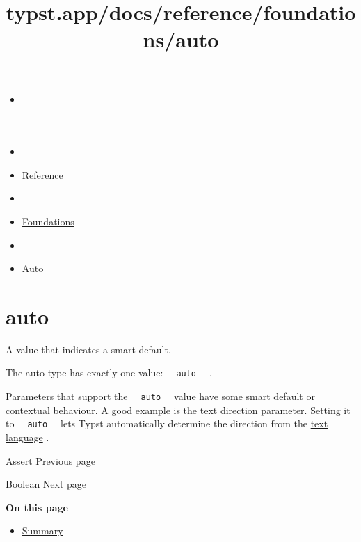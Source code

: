 \title{typst.app/docs/reference/foundations/auto}

\begin{itemize}
\tightlist
\item
  \href{/docs}{}
\item
  
\item
  \href{/docs/reference/}{Reference}
\item
  
\item
  \href{/docs/reference/foundations/}{Foundations}
\item
  
\item
  \href{/docs/reference/foundations/auto/}{Auto}
\end{itemize}

\section{\texorpdfstring{{ auto }}{ auto }}\label{summary}

A value that indicates a smart default.

The auto type has exactly one value:
\texttt{\ }{\texttt{\ auto\ }}\texttt{\ } .

Parameters that support the \texttt{\ }{\texttt{\ auto\ }}\texttt{\ }
value have some smart default or contextual behaviour. A good example is
the \href{/docs/reference/text/text/\#parameters-dir}{text direction}
parameter. Setting it to \texttt{\ }{\texttt{\ auto\ }}\texttt{\ } lets
Typst automatically determine the direction from the
\href{/docs/reference/text/text/\#parameters-lang}{text language} .

\href{/docs/reference/foundations/assert/}{\pandocbounded{}}

{ Assert } { Previous page }

\href{/docs/reference/foundations/bool/}{\pandocbounded{}}

{ Boolean } { Next page }

\textbf{On this page}

\begin{itemize}
\tightlist
\item
  \hyperref[summary]{Summary}
\end{itemize}

